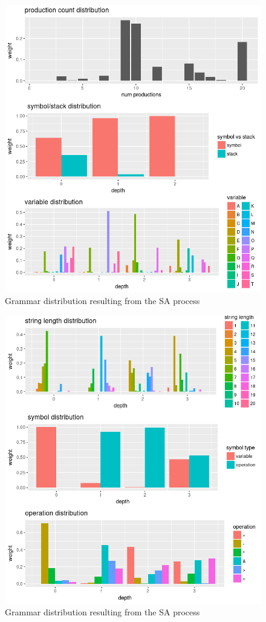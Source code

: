 \begin{figure}
    \centering
    \includegraphics[width=1.0\textwidth]{figures/sa-distribution-1}
    \caption{Grammar distribution resulting from the SA process}
    \label{fig:sa-distribution-1}
\end{figure}

\begin{figure}
    \centering
    \includegraphics[width=1.0\textwidth]{figures/sa-distribution-2}
    \caption{Grammar distribution resulting from the SA process}
    \label{fig:sa-distribution-2}
\end{figure}

